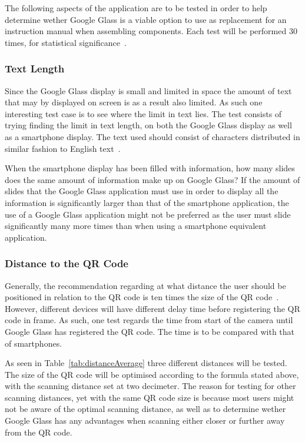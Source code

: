 The following aspects of the application are to be tested in order to help determine wether Google Glass is a viable option to use as replacement for an instruction manual when assembling components. Each test will be performed 30 times, for statistical significance~\cite{30sampleSize}.

\subsubsection{Text Length}
Since the Google Glass display is small and limited in space the amount of text that may by displayed on screen is as a result also limited. As such one interesting test case is to see where the limit in text lies. The test consists of trying finding the limit in text length, on both the Google Glass display as well as a smartphone display. The text used should consist of characters distributed in similar fashion to English text~\cite{englishTextStat}.

When the smartphone display has been filled with information, how many slides does the same amount of information make up on Google Glass? If the amount of slides that the Google Glass application must use in order to display all the information is significantly larger than that of the smartphone application, the use of a Google Glass application might not be preferred as the user must slide significantly many more times than when using a smartphone equivalent application.



\subsubsection{Distance to the QR Code}
Generally, the recommendation regarding at what distance the user should be positioned in relation to the QR code is ten times the size of the QR code~\cite{qrCodeSizeComplexity}. However, different devices will have different delay time before registering the QR code in frame. As such, one test regards the time from start of the camera until Google Glass has registered the QR code. The time is to be compared with that of smartphones.

As seen in Table~\ref{tab:distanceAverage} three different distances will be tested. The size of the QR code will be optimised according to the formula stated above, with the scanning distance set at two decimeter. The reason for testing for other scanning distances, yet with the same QR code size is because most users might not be aware of the optimal scanning distance, as well as to determine wether Google Glass has any advantages when scanning either closer or further away from the QR code.

